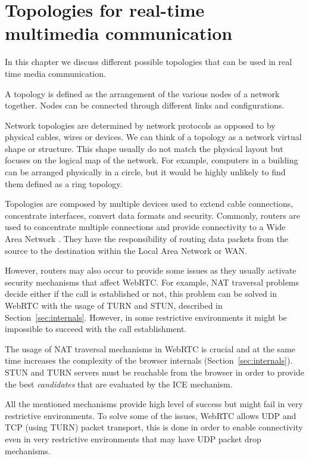 \section{Topologies for real-time multimedia communication}
\label{sec:topologies}

\thispagestyle{empty}

In this chapter we discuss different possible topologies that can be used in real time media communication.

A topology is defined as the arrangement of the various nodes of a network together. Nodes can be connected through different links and configurations. 

Network topologies are determined by network protocols as opposed to by physical cables, wires or devices. We can think of a topology as a network virtual shape or structure. This shape usually do not match the physical layout but focuses on the logical map of the network. For example, computers in a building can be arranged physically in a circle, but it would be highly unlikely to find them defined as a ring topology.

Topologies are composed by multiple devices used to extend cable connections, concentrate interfaces, convert data formats and security. Commonly, routers are used to concentrate multiple connections and provide connectivity to a Wide Area Network . They have the responsibility of routing data packets from the source to the destination within the Local Area Network  or WAN.  

However, routers may also occur to provide some issues as they usually activate security mechanisms that affect WebRTC. For example, NAT traversal problems decide either if the call is established or not, this problem can be solved in WebRTC with the usage of TURN and STUN, described in Section~\ref{sec:internals}. However, in some restrictive environments it might be impossible to succeed with the call establishment. 

The usage of NAT traversal mechanisms in WebRTC is crucial and at the same time increases the complexity of the browser internals (Section~\ref{sec:internals}). STUN and TURN servers must be reachable from the browser in order to provide the best {\it candidates} that are evaluated by the ICE mechanism.

All the mentioned mechanisms provide high level of success but might fail in very restrictive environments. To solve some of the issues, WebRTC allows UDP and TCP (using TURN) packet transport, this is done in order to enable connectivity even in very restrictive environments that may have UDP packet drop mechanisms. 

